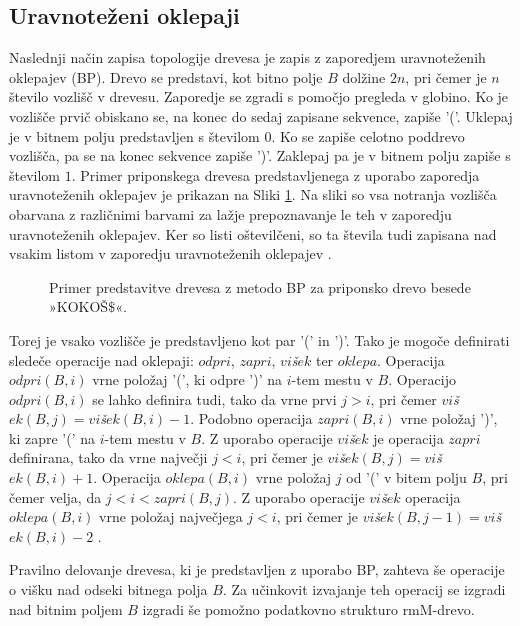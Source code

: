 \subsection{Uravnoteženi oklepaji}\label{sec:oklepaji}

Naslednji način zapisa topologije drevesa je zapis z zaporedjem uravnoteženih oklepajev (BP). Drevo se predstavi, kot bitno polje $B$ dolžine $2n$, pri čemer je $n$ število vozlišč v drevesu. Zaporedje se zgradi s pomočjo pregleda v globino. Ko je vozlišče prvič obiskano se, na konec do sedaj zapisane sekvence, zapiše '('. Uklepaj je v bitnem polju predstavljen s številom $0$. Ko se zapiše celotno poddrevo vozlišča, pa se na konec sekvence zapiše ')'. Zaklepaj pa je v bitnem polju zapiše s številom $1$. Primer priponskega drevesa predstavljenega z uporabo zaporedja uravnoteženih oklepajev je prikazan na Sliki \ref{fig:BP}. Na sliki so vsa notranja vozlišča obarvana z različnimi barvami za lažje prepoznavanje le teh v zaporedju uravnoteženih oklepajev. Ker so listi oštevilčeni, so ta števila tudi zapisana nad vsakim listom v zaporedju uravnoteženih oklepajev \cite{Navarro2016}.

\begin{figure}[htb]
    \begin{center}
        
        \caption{Primer predstavitve drevesa z metodo BP za priponsko drevo besede »KOKOŠ$\$$«.} 
        \label{fig:BP}
    \end{center}
\end{figure}

Torej je vsako vozlišče je predstavljeno kot par '(' in ')'. Tako je mogoče definirati sledeče operacije nad oklepaji: $odpri$, $zapri$, $vi$\textit{š}$ek$ ter $oklepa$. Operacija $odpri(B,i)$ vrne položaj '(', ki odpre ')' na $i$-tem mestu v $B$. Operacijo $odpri(B,i)$ se lahko definira tudi, tako da vrne prvi $j>i$, pri čemer $vi$\textit{š}$ek(B,j)=vi$\textit{š}$ek(B,i)-1$. Podobno operacija $zapri(B,i)$  vrne položaj ')', ki zapre '(' na $i$-tem mestu v $B$. Z uporabo operacije $vi$\textit{š}$ek$ je operacija $zapri$ definirana, tako da vrne največji $j<i$, pri čemer je $vi$\textit{š}$ek(B,j)=vi$\textit{š}$ek(B,i)+1$. Operacija $oklepa(B,i)$ vrne položaj $j$ od '(' v bitem polju $B$, pri čemer velja, da $j<i<zapri(B,j)$. Z uporabo operacije $vi$\textit{š}$ek$ operacija $oklepa(B,i)$ vrne položaj največjega $j<i$, pri čemer je $vi$\textit{š}$ek(B,j-1)=vi$\textit{š}$ek(B,i)-2$
 \cite{Navarro2016}.

Pravilno delovanje drevesa, ki je predstavljen z uporabo BP, zahteva še operacije o višku nad odseki bitnega polja $B$. Za učinkovit izvajanje teh operacij se izgradi nad bitnim poljem $B$ izgradi še pomožno podatkovno strukturo rmM-drevo.


